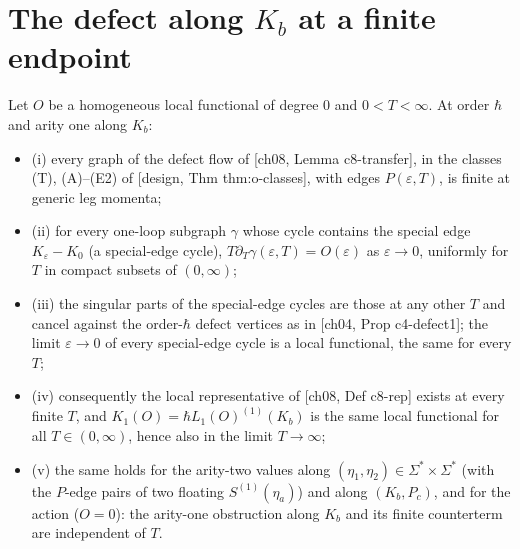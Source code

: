 \section{The defect along $K_b$ at a finite endpoint}

\begin{theorem}
\label{thm:ktr-defect}
Let $O$ be a homogeneous local functional of degree $0$ and $0<T<\infty$. At order $\hbar$ and arity one along $K_b$:
\begin{itemize}
\item (i) every graph of the defect flow of [ch08, Lemma c8-transfer], in the classes (T), (A)--(E2) of [design, Thm thm:o-classes], with edges $P(\varepsilon,T)$, is finite at generic leg momenta;
\item (ii) for every one-loop subgraph $\gamma$ whose cycle contains the special edge $K_\varepsilon-K_0$ (a special-edge cycle), $T\partial_T\gamma(\varepsilon,T)=O(\varepsilon)$ as $\varepsilon\to0$, uniformly for $T$ in compact subsets of $(0,\infty)$;
\item (iii) the singular parts of the special-edge cycles are those at any other $T$ and cancel against the order-$\hbar$ defect vertices as in [ch04, Prop c4-defect1]; the limit $\varepsilon\to0$ of every special-edge cycle is a local functional, the same for every $T$;
\item (iv) consequently the local representative of [ch08, Def c8-rep] exists at every finite $T$, and $K_1(O)=\hbar L_1(O)^{(1)}(K_b)$ is the same local functional for all $T\in(0,\infty)$, hence also in the limit $T\to\infty$;
\item (v) the same holds for the arity-two values along $(\eta_1,\eta_2)\in\Sigma^*\times\Sigma^*$ (with the $P$-edge pairs of two floating $S^{(1)}(\eta_a)$) and along $(K_b,P_c)$, and for the action ($O=0$): the arity-one obstruction along $K_b$ and its finite counterterm are independent of $T$.
\end{itemize}
\end{theorem}

